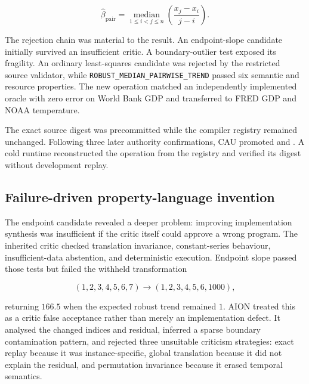 \begin{equation}
\label{eq:median-pairwise-trend}
\widehat{\beta}_{\mathrm{pair}}
=
\operatorname*{median}_{1\leq i<j\leq n}
\left(\frac{x_j-x_i}{j-i}\right).
\end{equation}

The rejection chain was material to the result.  An endpoint-slope candidate
initially survived an insufficient critic.  A boundary-outlier test exposed its
fragility.  An ordinary least-squares candidate was rejected by the restricted
source validator, while
\texttt{ROBUST\_MEDIAN\_PAIRWISE\_TREND} passed six semantic and resource
properties.  The new operation matched an independently implemented oracle
with zero error on World Bank GDP and transferred to FRED GDP and NOAA
temperature.

The exact source digest
\texttt{}
was precommitted while the compiler registry remained unchanged.  Following
three later authority confirmations, CAU promoted
\texttt{} and
\texttt{}.
A cold runtime reconstructed the operation from the registry and verified its
digest without development replay.

\subsection{Failure-driven property-language invention}
\label{subsec:property-language-invention}

The endpoint candidate revealed a deeper problem: improving implementation
synthesis was insufficient if the critic itself could approve a wrong program.
The inherited critic checked translation invariance, constant-series behaviour,
insufficient-data abstention, and deterministic execution.  Endpoint slope
passed those tests but failed the withheld transformation

\begin{equation}
(1,2,3,4,5,6,7)
\longrightarrow
(1,2,3,4,5,6,1000),
\end{equation}

returning $166.5$ when the expected robust trend remained $1$.  AION treated
this as a critic false acceptance rather than merely an implementation defect.
It analysed the changed indices and residual, inferred a sparse boundary
contamination pattern, and rejected three unsuitable criticism strategies:
exact replay because it was instance-specific, global translation because it
did not explain the residual, and permutation invariance because it erased
temporal semantics.

